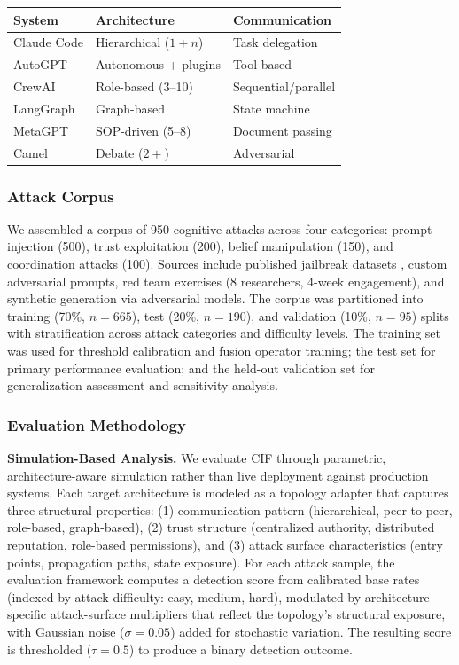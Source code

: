 \documentclass[
]{article}
\newcounter{none} %
\begin{document}
{\def\LTcaptype{none} %
\begin{longtable}[]{@{}lll@{}}
\toprule\noalign{}
System & Architecture & Communication \\
\midrule\noalign{}
\endhead
\bottomrule\noalign{}
\endlastfoot
Claude Code & Hierarchical (\(1 + n\)) & Task delegation \\
AutoGPT & Autonomous + plugins & Tool-based \\
CrewAI & Role-based (3--10) & Sequential/parallel \\
LangGraph & Graph-based & State machine \\
MetaGPT & SOP-driven (5--8) & Document passing \\
Camel & Debate (\(2+\)) & Adversarial \\
\end{longtable}
}

\subsubsection{Attack Corpus}\label{attack-corpus}

We assembled a corpus of 950 cognitive attacks across four categories:
prompt injection (500), trust exploitation (200), belief manipulation
(150), and coordination attacks (100). Sources include published
jailbreak datasets \cite{perez2023hackaprompt}, custom adversarial
prompts, red team exercises (8 researchers, 4-week engagement), and
synthetic generation via adversarial models. The corpus was partitioned
into training (70\%, \(n=665\)), test (20\%, \(n=190\)), and validation
(10\%, \(n=95\)) splits with stratification across attack categories and
difficulty levels. The training set was used for threshold calibration
and fusion operator training; the test set for primary performance
evaluation; and the held-out validation set for generalization
assessment and sensitivity analysis.

\subsubsection{Evaluation Methodology}\label{sec:eval-methodology}

\textbf{Simulation-Based Analysis.} We evaluate CIF through parametric,
architecture-aware simulation rather than live deployment against
production systems. Each target architecture is modeled as a topology
adapter that captures three structural properties: (1) communication
pattern (hierarchical, peer-to-peer, role-based, graph-based), (2) trust
structure (centralized authority, distributed reputation, role-based
permissions), and (3) attack surface characteristics (entry points,
propagation paths, state exposure). For each attack sample, the
evaluation framework computes a detection score from calibrated base
rates (indexed by attack difficulty: easy, medium, hard), modulated by
architecture-specific attack-surface multipliers that reflect the
topology's structural exposure, with Gaussian noise (\(\sigma = 0.05\))
added for stochastic variation. The resulting score is thresholded
(\(\tau = 0.5\)) to produce a binary detection outcome.
\end{document}
